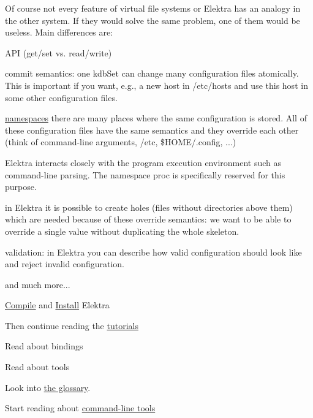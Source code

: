 Of course not every feature of virtual file systems or Elektra has an analogy in the other system. If they would solve the same problem, one of them would be useless. Main differences are\+:


\begin{DoxyItemize}
\item A\+PI (get/set vs. read/write)
\item commit semantics\+: one {\ttfamily kdb\+Set} can change many configuration files atomically. This is important if you want, e.\+g., a new host in {\ttfamily /etc/hosts} and use this host in some other configuration files.
\item \hyperlink{doc_help_elektra-namespaces_md}{namespaces} there are many places where the same configuration is stored. All of these configuration files have the same semantics and they override each other (think of command-\/line arguments, {\ttfamily /etc}, {\ttfamily \$\+H\+O\+ME/.config}, ...)
\item Elektra interacts closely with the program execution environment such as command-\/line parsing. The namespace {\ttfamily proc} is specifically reserved for this purpose.
\item in Elektra it is possible to create holes (files without directories above them) which are needed because of these override semantics\+: we want to be able to override a single value without duplicating the whole skeleton.
\item validation\+: in Elektra you can describe how valid configuration should look like and reject invalid configuration.
\item and much more...
\end{DoxyItemize}


\begin{DoxyItemize}
\item \hyperlink{doc_COMPILE_md}{Compile} and \hyperlink{doc_INSTALL_md}{Install} Elektra
\item Then continue reading the \hyperlink{md_doc_tutorials_README_doc_tutorials_README_md}{tutorials}
\item Read about bindings
\item Read about tools
\item Look into \hyperlink{doc_help_elektra-glossary_md}{the glossary}.
\item Start reading about \hyperlink{doc_help_kdb_md}{command-\/line tools} 
\end{DoxyItemize}